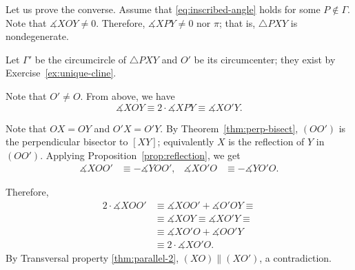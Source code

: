 Let us prove the converse.
Assume that \ref{eq:inscribed-angle} holds for some $P\notin \Gamma$.
Note that $\measuredangle X O Y\ne 0$. 
Therefore, $\measuredangle X P Y\ne 0$ nor $\pi$;
that is, $\triangle PXY$ is nondegenerate.

Let $\Gamma'$ be the circumcircle of $\triangle PXY$
and $O'$ be its circumcenter;
they exist by Exercise~\ref{ex:unique-cline}.


Note that $O'\ne O$.
From above, we have 
$$\measuredangle X O Y\equiv 2\cdot\measuredangle X P Y\equiv \measuredangle X O' Y.$$

Note that $OX=OY$ and $O'X=O'Y$.
By Theorem~\ref{thm:perp-bisect},
$(OO')$ is the perpendicular bisector to $[XY]$;
equivalently $X$ is the reflection of $Y$ in $(OO')$.
Applying Proposition~\ref{prop:reflection}, we get
\begin{align*}
\measuredangle X O O'&\equiv -\measuredangle Y O O',
&
\measuredangle X O' O&\equiv -\measuredangle Y O' O.
\end{align*}

Therefore, 
\begin{align*}
2\cdot \measuredangle X O O'
&\equiv\measuredangle X O O'+\measuredangle O' O Y
\equiv
\\
&\equiv \measuredangle X O Y\equiv \measuredangle X O' Y\equiv
\\
&\equiv\measuredangle X O' O+\measuredangle O O' Y
\\
&\equiv 2\cdot \measuredangle X O' O.
\end{align*}
By Transversal property \ref{thm:parallel-2},
$(X O)\parallel (XO')$, a contradiction.
\qeds

